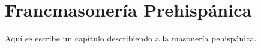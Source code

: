 \chapter{Francmasonería Prehispánica}
\label{chapter:MasPrehisp}

Aquí se escribe un capítulo describiendo a la masonería pehispánica.